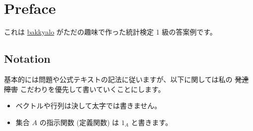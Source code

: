 \documentclass[./main.tex]{subfiles}
\begin{document}
    \section*{Preface}

    これは \href{https://github.com/bakkyalo}{bakkyalo} がただの趣味で作った統計検定 1 級の答案例です。

    \subsection*{Notation}

    基本的には問題や公式テキストの記法に従いますが、以下に関しては私の \sout{発達障害} こだわりを優先して書いていくことにします。
    \begin{itemize}
        \item ベクトルや行列は決して太字では書きません。
        \item 集合 $A$ の指示関数 (定義関数) は $1_A$ と書きます。
    \end{itemize}
\end{document}
